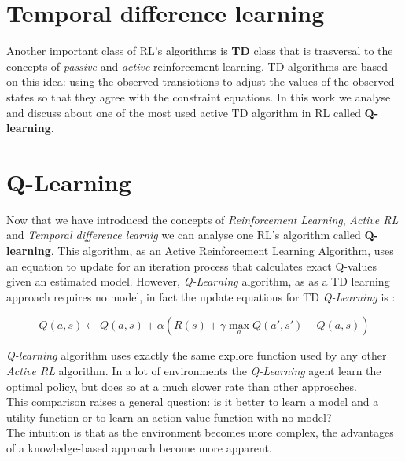 \documentclass[]{report}
\begin{document}
\section{Temporal difference learning}
Another important class of RL's algorithms is \textbf{TD} class that is trasversal to the concepts of \emph{passive} and \emph{active} reinforcement learning.
TD algorithms are based on this idea: using the observed transiotions to adjust the values of the observed states so that they agree with the constraint equations.
In this work we analyse and discuss about one of the most used active TD algorithm in RL called \textbf{Q-learning}.

\section{Q-Learning}

Now that we have introduced the concepts of \emph{Reinforcement Learning}, \emph{Active RL} and \emph{Temporal difference learnig} we can analyse one RL's algorithm called \textbf{Q-learning}.
This algorithm, as an Active Reinforcement Learning Algorithm, uses an equation to update for an iteration process that calculates exact Q-values given an estimated model.
However, \emph{Q-Learning} algorithm, as as a TD learning approach requires no model, in fact the update equations for TD \emph{Q-Learning} is :

\begin{equation*}
		Q(a,s) \leftarrow Q(a,s) + \alpha (R(s) + \gamma \max_a Q(a',s')-Q(a,s))
\end{equation*}

\emph{Q-learning}  algorithm uses exactly the same explore function used by any other \emph{Active RL} algorithm.
In a lot of environments the \emph{Q-Learning} agent learn the optimal policy, but does so at a much slower rate than other approsches.\\
This comparison raises a general question: is it better to learn a model and a utility function or to learn an action-value function with no model?\\
The intuition is that as the environment becomes more complex, the advantages of a knowledge-based approach become more apparent.
\end{document}
